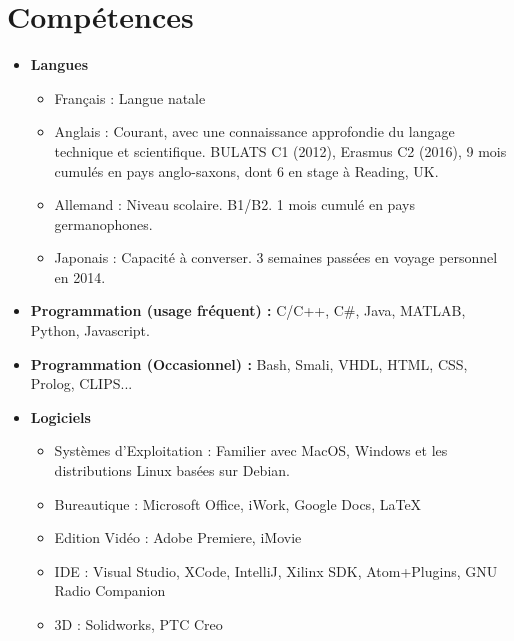\documentclass[11pt,a4paper,sans]{moderncv}        %
\begin{document}
\section{Compétences}

\vspace{6pt}

\begin{itemize}

\item \textbf{Langues} 
\begin{itemize}
\item Français : Langue natale
\item Anglais : Courant, avec une connaissance approfondie du langage technique et scientifique. BULATS C1 (2012), Erasmus C2 (2016), 9 mois cumulés en pays anglo-saxons, dont 6 en stage à Reading, UK.
\item Allemand : Niveau scolaire. B1/B2. 1 mois cumulé en pays germanophones.
\item Japonais : Capacité à converser. 3 semaines passées en voyage personnel en 2014.
\end{itemize}

\vspace{6pt}

\item \textbf{Programmation (usage fréquent) :} C/C++, C\#, Java, MATLAB, Python, Javascript.
\item \textbf{Programmation (Occasionnel) :} Bash, Smali, VHDL, HTML, CSS, Prolog, CLIPS...

\vspace{6pt}

\item \textbf{Logiciels}
\begin{itemize}
\item Systèmes d'Exploitation : Familier avec MacOS, Windows et les distributions Linux basées sur Debian.
\item Bureautique : Microsoft Office, iWork, Google Docs, \LaTeX
\item Edition Vidéo : Adobe Premiere, iMovie
\item IDE : Visual Studio, XCode, IntelliJ, Xilinx SDK, Atom+Plugins, GNU Radio Companion
\item 3D : Solidworks, PTC Creo
\end{itemize}

\vspace{6pt}


\end{itemize}
\end{document}
